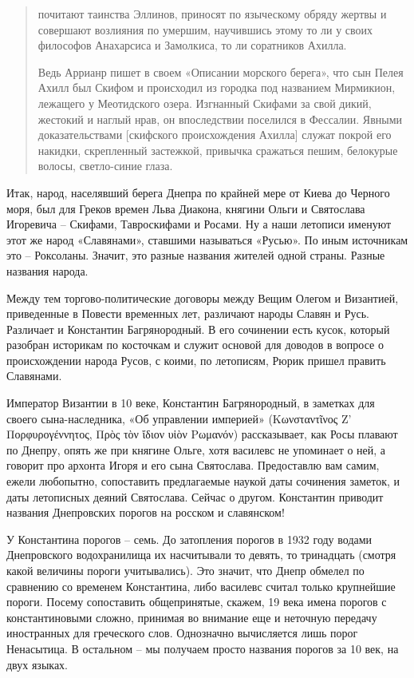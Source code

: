 \begin{quotation}
почитают таинства Эллинов, приносят по языческому обряду жертвы и совершают возлияния по умершим, научившись этому то ли у своих философов Анахарсиса и Замолкиса, то ли соратников Ахилла. 

Ведь Аррианр пишет в своем «Описании морского берега», что сын Пелея Ахилл был Скифом и происходил из городка под названием Мирмикион, лежащего у Меотидского озера. Изгнанный Скифами за свой дикий, жестокий и наглый нрав, он впоследствии поселился в Фессалии. Явными доказательствами [скифского происхождения Ахилла] служат покрой его накидки, скрепленный застежкой, привычка сражаться пешим, белокурые волосы, светло-синие глаза.
\end{quotation}

Итак, народ, населявший берега Днепра по крайней мере от Киева до Черного моря, был для Греков времен Льва Диакона, княгини Ольги и Святослава Игоревича – Скифами, Тавроскифами и Росами. Ну а наши летописи именуют этот же народ «Славянами», ставшими называться «Русью». По иным источникам это – Роксоланы. Значит, это разные названия жителей одной страны. Разные названия народа.

Между тем торгово-политические договоры между Вещим Олегом и Византией, приведенные в Повести временных лет, различают народы Славян и Русь. Различает и Константин Багрянородный. В его сочинении есть кусок, который разобран историкам по косточкам и служит основой для доводов в вопросе о происхождении народа Русов, с коими, по летописям, Рюрик пришел править Славянами.

Император Византии в 10 веке, Константин Багрянородный, в заметках для своего сына-наследника, «Об управлении империей»\cite{kbagr01} (Κωνσταντῖνος Ζ’ Πορφυρο\-γέννητος, Πρὸς τὸν ἴδιον υἱὸν Ρωμανόν) рассказывает, как Росы плавают по Днепру, опять же при княгине Ольге, хотя василевс не упоминает о ней, а говорит про архонта Игоря и его сына Святослава. Предоставлю вам самим, ежели любопытно, сопоставить предлагаемые наукой даты сочинения заметок, и даты летописных деяний Святослава. Сейчас о другом. Константин приводит названия Днепровских порогов на росском и славянском!

У Константина порогов – семь. До затопления порогов в 1932 году водами Днепровского водохранилища их насчитывали то девять, то тринадцать (смотря какой величины пороги учитывались). Это значит, что Днепр обмелел по сравнению со временем Константина, либо василевс считал только крупнейшие пороги. Посему сопоставить общепринятые, скажем, 19 века имена порогов с константиновыми сложно, принимая во внимание еще и неточную передачу иностранных для греческого слов. Однозначно вычисляется лишь порог Ненасытица. В остальном – мы получаем просто названия порогов за 10 век, на двух языках.

